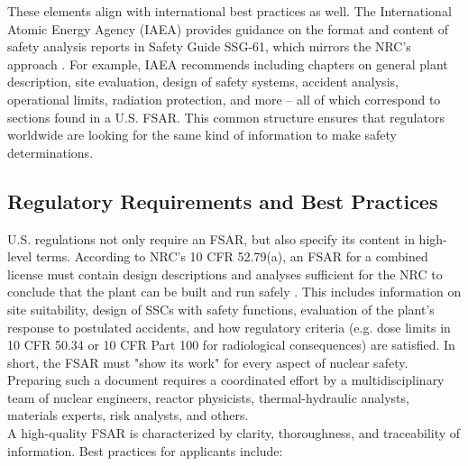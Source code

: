 \documentclass[5p,authoryear]{elsarticle}
\begin{document}
\vspace{0.2cm}
These elements align with international best practices as well. The International Atomic Energy Agency (IAEA) provides guidance on the format and content of safety analysis reports in Safety Guide SSG-61, which mirrors the NRC’s approach \cite{IAEA2021}. For example, IAEA recommends including chapters on general plant description, site evaluation, design of safety systems, accident analysis, operational limits, radiation protection, and more – all of which correspond to sections found in a U.S. FSAR. This common structure ensures that regulators worldwide are looking for the same kind of information to make safety determinations. 

\subsection{Regulatory Requirements and Best Practices} 
\vspace{0.2cm}

U.S. regulations not only require an FSAR, but also specify its content in high-level terms. According to NRC's 10 CFR 52.79(a), an FSAR for a combined license must contain design descriptions and analyses sufficient for the NRC to conclude that the plant can be built and run safely \cite{CFR52.79}. This includes information on site suitability, design of SSCs with safety functions, evaluation of the plant's response to postulated accidents, and how regulatory criteria (e.g. dose limits in 10 CFR 50.34 or 10 CFR Part 100 for radiological consequences) are satisfied. In short, the FSAR must "show its work" for every aspect of nuclear safety. Preparing such a document requires a coordinated effort by a multidisciplinary team of nuclear engineers, reactor physicists, thermal-hydraulic analysts, materials experts, risk analysts, and others. \\

A high-quality FSAR is characterized by clarity, thoroughness, and traceability of information. Best practices for applicants include:
\end{document}
